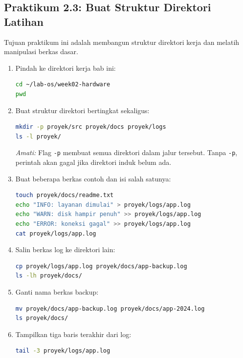 \subsection*{Praktikum 2.3: Buat Struktur Direktori Latihan}

Tujuan praktikum ini adalah membangun struktur direktori kerja dan melatih manipulasi berkas dasar.

\begin{enumerate}
    \item Pindah ke direktori kerja bab ini:
\begin{lstlisting}[language=bash, caption={Masuk ke direktori kerja}]
cd ~/lab-os/week02-hardware
pwd
\end{lstlisting}

    \item Buat struktur direktori bertingkat sekaligus:
\begin{lstlisting}[language=bash, caption={Membuat struktur direktori}]
mkdir -p proyek/src proyek/docs proyek/logs
ls -l proyek/
\end{lstlisting}
    \textit{Amati:} Flag \texttt{-p} membuat semua direktori dalam jalur tersebut. Tanpa \texttt{-p}, perintah akan gagal jika direktori induk belum ada.

    \item Buat beberapa berkas contoh dan isi salah satunya:
\begin{lstlisting}[language=bash, caption={Membuat dan mengisi berkas}]
touch proyek/docs/readme.txt
echo "INFO: layanan dimulai" > proyek/logs/app.log
echo "WARN: disk hampir penuh" >> proyek/logs/app.log
echo "ERROR: koneksi gagal" >> proyek/logs/app.log
cat proyek/logs/app.log
\end{lstlisting}

    \item Salin berkas log ke direktori lain:
\begin{lstlisting}[language=bash, caption={Menyalin berkas}]
cp proyek/logs/app.log proyek/docs/app-backup.log
ls -lh proyek/docs/
\end{lstlisting}

    \item Ganti nama berkas backup:
\begin{lstlisting}[language=bash, caption={Mengganti nama berkas}]
mv proyek/docs/app-backup.log proyek/docs/app-2024.log
ls proyek/docs/
\end{lstlisting}

    \item Tampilkan tiga baris terakhir dari log:
\begin{lstlisting}[language=bash, caption={Membaca akhir berkas log}]
tail -3 proyek/logs/app.log
\end{lstlisting}
\end{enumerate}

